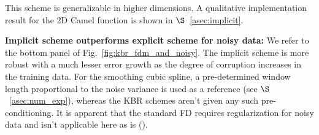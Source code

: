 \documentclass{article} %
\theoremstyle{plain}
\begin{document}
This scheme is generalizable in higher dimensions. A qualitative implementation result for the 2D Camel function is shown in $\S$~\ref{asec:implicit}. 


\textbf{Implicit scheme outperforms explicit scheme for noisy data:} We refer to the bottom panel of Fig.~\ref{fig:kbr_fdm_and_noisy}. The implicit scheme is more robust with a much lesser error growth as the degree of corruption increases in the training data. For the smoothing cubic spline, a pre-determined window length proportional to the noise variance is used as a reference (see $\S$~\ref{asec:num_exp}), whereas the KBR schemes aren't given any such pre-conditioning. It is apparent that the standard FD requires regularization for noisy data and isn't applicable here as is (\cite{chartrand2011numerical}).
\end{document}

